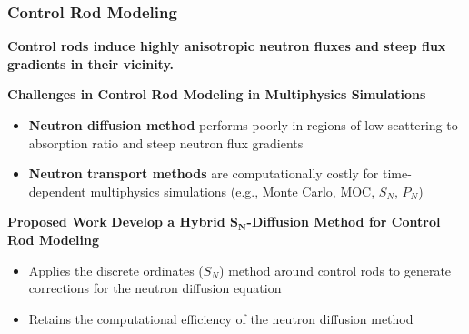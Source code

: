 \begin{frame}
  \frametitle{Control Rod Modeling}
  \textbf{Control rods induce highly anisotropic neutron fluxes and steep flux gradients in their
  vicinity.}
  \pause
  \begin{block}{\textbf{Challenges in Control Rod Modeling in Multiphysics Simulations}}
    \begin{itemize}
      \item \textbf{Neutron diffusion method} performs poorly in regions of low
        scattering-to-absorption ratio and steep neutron flux gradients
      \item \textbf{Neutron transport methods} are computationally costly for time-dependent
        multiphysics simulations (e.g., Monte Carlo, MOC, $S_N$, $P_N$)
    \end{itemize}
  \end{block}
  \pause
  \begin{block}{\textbf{Proposed Work}}
    \textbf{Develop a Hybrid $\bm{S_N}$-Diffusion Method for Control Rod Modeling}
    \begin{itemize}
      \item Applies the discrete ordinates ($S_N$) method around control rods to
        generate corrections for the neutron diffusion equation
      \item Retains the computational efficiency of the neutron diffusion method
    \end{itemize}
  \end{block}
\end{frame}
